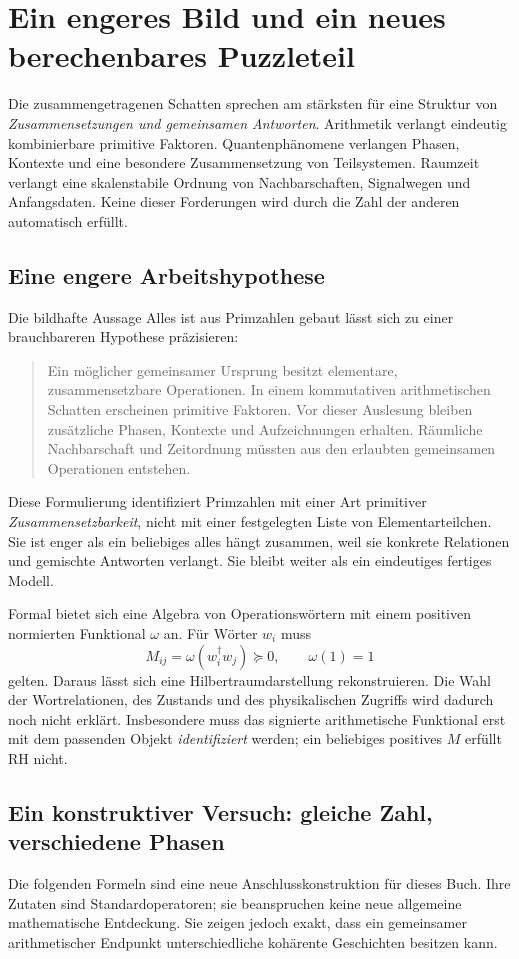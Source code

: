 \chapter{Ein engeres Bild und ein neues berechenbares Puzzleteil}
\label{ch:shadow-synthesis}
Die zusammengetragenen Schatten sprechen am stärksten für eine Struktur von \emph{Zusammensetzungen und gemeinsamen Antworten}. Arithmetik verlangt eindeutig kombinierbare primitive Faktoren. Quantenphänomene verlangen Phasen, Kontexte und eine besondere Zusammensetzung von Teilsystemen. Raumzeit verlangt eine skalenstabile Ordnung von Nachbarschaften, Signalwegen und Anfangsdaten. Keine dieser Forderungen wird durch die Zahl der anderen automatisch erfüllt.

\section{Eine engere Arbeitshypothese}
Die bildhafte Aussage \glqq Alles ist aus Primzahlen gebaut\grqq{} lässt sich zu einer brauchbareren Hypothese präzisieren:
\begin{quote}
Ein möglicher gemeinsamer Ursprung besitzt elementare, zusammensetzbare Operationen. In einem kommutativen arithmetischen Schatten erscheinen primitive Faktoren. Vor dieser Auslesung bleiben zusätzliche Phasen, Kontexte und Aufzeichnungen erhalten. Räumliche Nachbarschaft und Zeitordnung müssten aus den erlaubten gemeinsamen Operationen entstehen.
\end{quote}
 Diese Formulierung identifiziert Primzahlen mit einer Art primitiver \emph{Zusammensetzbarkeit}, nicht mit einer festgelegten Liste von Elementarteilchen. Sie ist enger als ein beliebiges \glqq alles hängt zusammen\grqq{}, weil sie konkrete Relationen und gemischte Antworten verlangt. Sie bleibt weiter als ein eindeutiges fertiges Modell.

Formal bietet sich eine Algebra von Operationswörtern mit einem positiven normierten Funktional $\omega$ an. Für Wörter $w_i$ muss
\[
 M_{ij}=\omega(w_i^\dagger w_j)\succeq0,\qquad\omega(1)=1
\]
gelten. Daraus lässt sich eine Hilbertraumdarstellung rekonstruieren. Die Wahl der Wortrelationen, des Zustands und des physikalischen Zugriffs wird dadurch noch nicht erklärt. Insbesondere muss das signierte arithmetische Funktional erst mit dem passenden Objekt \emph{identifiziert} werden; ein beliebiges positives $M$ erfüllt RH nicht.

\section{Ein konstruktiver Versuch: gleiche Zahl, verschiedene Phasen}
Die folgenden Formeln sind eine neue Anschlusskonstruktion für dieses Buch. Ihre Zutaten sind Standardoperatoren; sie beanspruchen keine neue allgemeine mathematische Entdeckung. Sie zeigen jedoch exakt, dass ein gemeinsamer arithmetischer Endpunkt unterschiedliche kohärente Geschichten besitzen kann.

